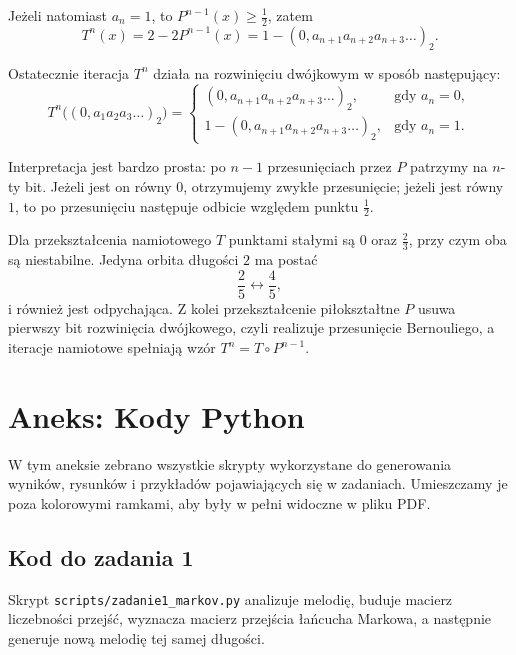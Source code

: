 \documentclass[11pt,a4paper]{article}
\theoremstyle{plain}
\theoremstyle{definition}
\newcounter{zadanie}
\begin{document}
\begin{rozwiazaniebox}
Je\.zeli natomiast \(a_n=1\), to \(P^{n-1}(x)\ge \tfrac{1}{2}\), zatem
\[
    T^n(x)=2-2P^{n-1}(x)
    =1-(0,a_{n+1}a_{n+2}a_{n+3}\ldots)_2.
\]

Ostatecznie iteracja \(T^n\) dzia\l a na rozwini\k{e}ciu dw\'ojkowym w spos\'ob nast\k{e}puj\k{a}cy:
\[
T^n\bigl((0,a_1a_2a_3\ldots)_2\bigr)=
\begin{cases}
(0,a_{n+1}a_{n+2}a_{n+3}\ldots)_2, & \text{gdy } a_n=0,\\[0.4em]
1-(0,a_{n+1}a_{n+2}a_{n+3}\ldots)_2, & \text{gdy } a_n=1.
\end{cases}
\]

Interpretacja jest bardzo prosta: po \(n-1\) przesuni\k{e}ciach przez \(P\) patrzymy na \(n\)-ty bit.
Je\.zeli jest on r\'owny \(0\), otrzymujemy zwyk\l e przesuni\k{e}cie; je\.zeli jest r\'owny \(1\),
to po przesuni\k{e}ciu nast\k{e}puje odbicie wzgl\k{e}dem punktu \(\tfrac{1}{2}\).

\end{rozwiazaniebox}

\begin{wynikbox}
Dla przekszta\l cenia namiotowego \(T\) punktami sta\l ymi s\k{a} \(0\) oraz \(\tfrac{2}{3}\), przy czym
oba s\k{a} niestabilne. Jedyna orbita d\l ugo\'sci \(2\) ma posta\'c
\[
    \frac{2}{5} \longleftrightarrow \frac{4}{5},
\]
i r\'ownie\.z jest odpychaj\k{a}ca. Z kolei przekszta\l cenie pi\l okszta\l tne \(P\) usuwa pierwszy bit
rozwini\k{e}cia dw\'ojkowego, czyli realizuje przesuni\k{e}cie Bernouliego, a iteracje namiotowe spe\l niaj\k{a}
wz\'or \(T^n=T\circ P^{n-1}\).
\end{wynikbox}

\clearpage
\section{Aneks: Kody Python}

W tym aneksie zebrano wszystkie skrypty wykorzystane do generowania wynik\'ow, rysunk\'ow
i przyk\l ad\'ow pojawiaj\k{a}cych si\k{e} w zadaniach. Umieszczamy je poza kolorowymi ramkami,
aby by\l y w pe\l ni widoczne w pliku PDF.

\subsection{Kod do zadania 1}

Skrypt \texttt{scripts/zadanie1\_markov.py} analizuje melodi\k{e}, buduje macierz liczebno\'sci
przej\'s\'c, wyznacza macierz przej\'scia \l a\'ncucha Markowa, a nast\k{e}pnie generuje now\k{a}
melodi\k{e} tej samej d\l ugo\'sci.
\end{document}
